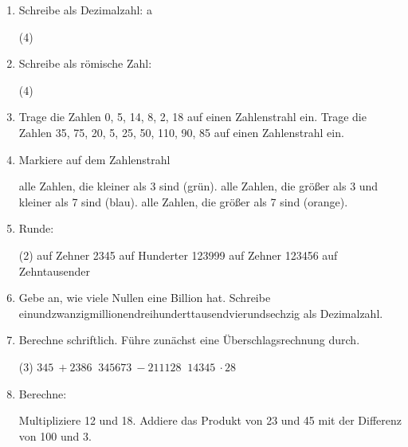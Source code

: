 \documentclass[a5paper]{scrartcl}
\newcommand{\Rom}[1]{\uppercase{\expandafter\romannumeral#1}}
\begin{document}
\begin{enumerate}
	\item Schreibe als Dezimalzahl: a
		\begin{tasks}(4)
			\task \Rom{6}
			\task \Rom{9}
			\task \Rom{1900}
			\task \Rom{48}
		\end{tasks}
	\item Schreibe als römische Zahl:
		\begin{tasks}(4)
			\task 12
			\task 53
			\task 900
			\task 2019
		\end{tasks}
	\item 
		\begin{tasks}
			\task Trage die Zahlen 0, 5, 14, 8, 2, 18 auf einen Zahlenstrahl ein.
			\task Trage die Zahlen 35, 75, 20, 5, 25, 50, 110, 90, 85 auf einen Zahlenstrahl ein.
		\end{tasks}
	\item 
		Markiere auf dem Zahlenstrahl
		\begin{tasks}
			\task alle Zahlen, die kleiner als 3 sind (grün).
			\task alle Zahlen, die größer als 3 und kleiner als 7 sind (blau).
			\task alle Zahlen, die größer als 7 sind (orange).
		\end{tasks}
		\vspace{21pt}
\item Runde:
	\begin{tasks}(2)
		 auf Zehner
		\task \SI{2345}{} auf Hunderter
		\task \SI{123999}{} auf Zehner
		\task \SI{123456}{} auf Zehntausender
	\end{tasks}
\item
	\begin{tasks}
		\task Gebe an, wie viele Nullen eine Billion hat.
		\task Schreibe einundzwanzigmillionendreihunderttausendvierundsechzig als Dezimalzahl.
	\end{tasks}
\item Berechne schriftlich. Führe zunächst eine Überschlagsrechnung durch.
	\begin{tasks}(3)
		\task $\SI{345}{}+\SI{2386}{}$
		\task $\SI{345673}{}-\SI{211128}{}$
		\task $\SI{14345}{}\cdot \SI{28}{}$
	\end{tasks}
\item Berechne:
	\begin{tasks}
		\task Multipliziere 12 und 18.
		\task Addiere das Produkt von 23 und 45 mit der Differenz von 100 und 3.
	\end{tasks}
\end{enumerate}
\end{document}
